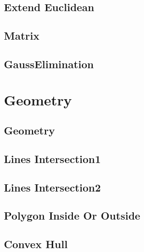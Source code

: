 \subsection{Extend Euclidean}


\subsection{Matrix}



\subsection{GaussElimination}

\section{Geometry}

\subsection{Geometry}


\subsection{Lines Intersection1}


\subsection{Lines Intersection2}


\subsection{Polygon Inside Or Outside}


\subsection{Convex Hull}


